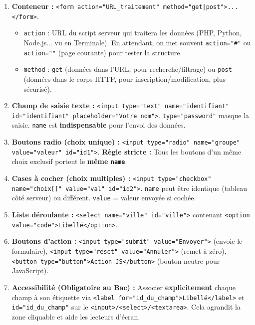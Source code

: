 \documentclass[11pt]{article}
\begin{document}
\begin{methode}
\begin{enumerate}
  \item \textbf{Conteneur :} \texttt{<form action="URL\_traitement" method="get|post">...</form>}.
        \begin{itemize}
          \item \texttt{action} : URL du script serveur qui traitera les données (PHP, Python, Node.js... vu en Terminale). En attendant, on met souvent \texttt{action="\#"} ou \texttt{action=""} (page courante) pour tester la structure.
          \item \texttt{method} : \texttt{get} (données dans l'URL, pour recherche/filtrage) ou \texttt{post} (données dans le corps HTTP, pour inscription/modification, plus sécurisé).
        \end{itemize}
  \item \textbf{Champ de saisie texte :} \texttt{<input type="text" name="identifiant" id="identifiant" placeholder="Votre nom">}.
        \texttt{type="password"} masque la saisie. \texttt{name} est \textbf{indispensable} pour l'envoi des données.
  \item \textbf{Boutons radio (choix unique) :} \texttt{<input type="radio" name="groupe" value="valeur" id="id1">}.
        \textbf{Règle stricte :} Tous les boutons d'un même choix exclusif portent le \textbf{même \texttt{name}}.
  \item \textbf{Cases à cocher (choix multiples) :} \texttt{<input type="checkbox" name="choix[]" value="val" id="id2">}.
        \texttt{name} peut être identique (tableau côté serveur) ou différent. \texttt{value} = valeur envoyée si cochée.
  \item \textbf{Liste déroulante :} \texttt{<select name="ville" id="ville">} contenant \texttt{<option value="code">Libellé</option>}.
  \item \textbf{Boutons d'action :}
        \texttt{<input type="submit" value="Envoyer">} (envoie le formulaire),
        \texttt{<input type="reset" value="Annuler">} (remet à zéro),
        \texttt{<button type="button">Action JS</button>} (bouton neutre pour JavaScript).
  \item \textbf{Accessibilité (Obligatoire au Bac) :} Associer \textbf{explicitement} chaque champ à son étiquette via \texttt{<label for="id\_du\_champ">Libellé</label>} et \texttt{id="id\_du\_champ"} sur le \texttt{<input>/<select>/<textarea>}. Cela agrandit la zone cliquable et aide les lecteurs d'écran.
\end{enumerate}
\end{methode}
\end{document}
